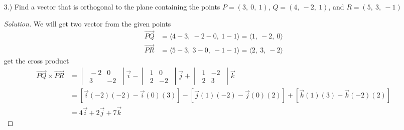 \documentclass[12pt]{article}
\begin{document}
\begin{enumerate}
\begin{proof}[Solution]
\begin{align*}
\begin{vmatrix}
							~0 &4~ \\
							~ 3&-1~
						\end{vmatrix}\vec{k} \\
						& = \left[\vec{i}\left(4\right)\left(5\right)-\vec{i}\left(-2\right)\left(-1\right)\right]-\left[\vec{j}\left(0\right)\left(5\right)-\vec{j}\left(-2\right)\left(3\right)\right]+\left[\vec{k}\left(0\right)\left(-1\right)-\vec{k}\left(4\right)\left(3\right)\right] \\
						& = 18\vec{i}-6\vec{j}-12\vec{k} \\
						& \Leftrightarrow \langle 18,~-6,~-12\rangle
					\end{align*}
				\end{proof}
				\hrule
			
			\item[3.)] Find a vector that is orthogonal to the plane containing the points \(P = \left(3,~0,~1\right)\), \(Q = \left(4,~-2,~1\right)\), and \(R = \left(5,~3,~-1\right)\)
				\begin{proof}[Solution]
					We will get two vector from the given points
					\begin{align*}
						\overrightarrow{PQ} & = \langle 4-3,~-2-0,~1-1\rangle = \langle 1,~-2,~0\rangle \\
						\overrightarrow{PR} & = \langle 5-3,~3-0,~-1-1\rangle = \langle 2,~3,~-2\rangle
					\end{align*}
					get the cross product
					\begin{align*}
						\overrightarrow{PQ} \times \overrightarrow{PR} & = \begin{vmatrix}
							~-2 &0~ \\
							~3&-2~
						\end{vmatrix}\vec{i} - \begin{vmatrix}
							~1&0~ \\
							~2&-2~
						\end{vmatrix}\vec{j} + \begin{vmatrix}
							~1&-2~ \\
							~2&3~
						\end{vmatrix}\vec{k} \\
						& = \left[\vec{i}(-2)(-2)-\vec{i}(0)(3)\right]-\left[\vec{j}(1)(-2)-\vec{j}(0)(2)\right]+\left[\vec{k}(1)(3)-\vec{k}(-2)(2)\right] \\
						& = 4\vec{i}+2\vec{j}+7\vec{k}
					\end{align*}
				\end{proof}
		\end{enumerate}
	
\end{document}

